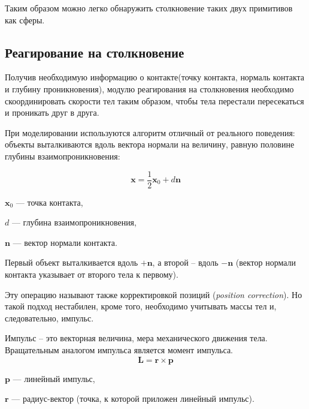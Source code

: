 Таким образом можно легко обнаружить столкновение таких двух примитивов как сферы.
\subsection{Реагирование на столкновение}
Получив необходимую информацию о контакте(точку контакта, нормаль контакта и глубину проникновения), модулю реагирования
на столкновения необходимо скоординировать скорости тел таким образом, чтобы тела перестали пересекаться и проникать друг в друга.  

При моделировании используются алгоритм отличный от реального поведения: объекты выталкиваются вдоль вектора нормали на величину,
равную половине глубины взаимопроникновения:

\begin{equation}
\mathbf{x} = \frac{1}{2}\mathbf{x}_0 + d\mathbf{n}
\end{equation}
\begin{eqrem}
$\mathbf{x}_0$ --- точка контакта,

$d$ --- глубина взаимопроникновения,

$\mathbf{n}$ --- вектор нормали контакта.
\end{eqrem}

Первый объект выталкивается вдоль $+\mathbf{n}$, а второй – вдоль $-\mathbf{n}$ (вектор нормали контакта указывает от второго тела к первому).

Эту операцию называют также корректировкой позиций (\textit{position correction}). Но такой подход нестабилен, кроме того,
необходимо учитывать массы тел и, следовательно, импульс.

Импульс – это векторная величина, мера механического движения тела. Вращательным аналогом импульса является момент импульса.
\begin{equation}
\mathbf{L} = \mathbf{r}\times\mathbf{p}
\end{equation}
\begin{eqrem}
$\mathbf{p}$ --- линейный импульс,

$\mathbf{r}$ --- радиус-вектор (точка, к которой приложен линейный импульс).
\end{eqrem}